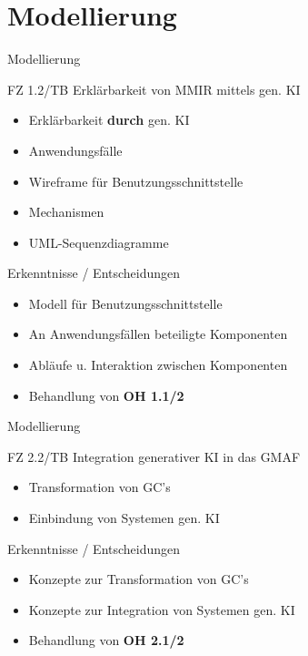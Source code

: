 \documentclass[t]{beamer}
\begin{document}
\section{Modellierung}

\begin{frame}{Modellierung}

  \begin{block}{FZ 1.2/TB Erklärbarkeit von MMIR mittels gen. KI}
    \begin{itemize}
      \item Erklärbarkeit \textbf{durch} gen. KI
      \item Anwendungsfälle
      \item Wireframe für Benutzungsschnittstelle
      \item Mechanismen
      \item UML-Sequenzdiagramme
    \end{itemize}
  \end{block}

  \begin{exampleblock}{Erkenntnisse / Entscheidungen}
    \begin{itemize}
      \item Modell für Benutzungsschnittstelle
      \item An Anwendungsfällen beteiligte Komponenten
      \item Abläufe u. Interaktion zwischen Komponenten
      \item Behandlung von \textbf{OH 1.1/2}
    \end{itemize}
  \end{exampleblock}

\end{frame}

\begin{frame}{Modellierung}

  \begin{block}{FZ 2.2/TB Integration generativer KI in das GMAF}
    \begin{itemize}
      \item Transformation von GC's
      \item Einbindung von Systemen gen. KI
    \end{itemize}
  \end{block}

  \begin{exampleblock}{Erkenntnisse / Entscheidungen}
    \begin{itemize}
      \item Konzepte zur Transformation von GC's
      \item Konzepte zur Integration von Systemen gen. KI
      \item Behandlung von \textbf{OH 2.1/2}
    \end{itemize}
  \end{exampleblock}

\end{frame}
\end{document}
